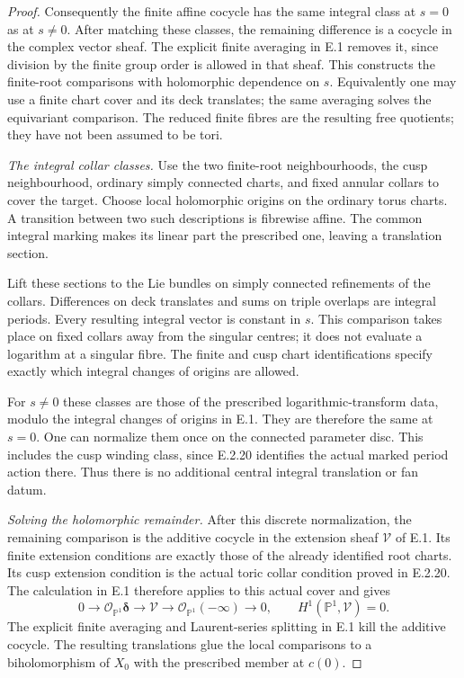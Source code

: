 \begin{proof}
Consequently the finite affine cocycle has the same
integral class at $s=0$ as at $s\ne0$.  After matching
these classes, the remaining difference is a cocycle
in the complex vector sheaf.  The explicit finite
averaging in E.1 removes it, since division by the
finite group order is allowed in that sheaf.
This constructs the finite-root comparisons with
holomorphic dependence on $s$.  Equivalently one
may use a finite chart cover and its deck translates;
the same averaging solves the equivariant comparison.
The reduced finite fibres are the resulting free
quotients; they have not been assumed to be tori.

\emph{The integral collar classes.}
Use the two finite-root neighbourhoods, the cusp
neighbourhood, ordinary simply connected charts,
and fixed annular collars to cover the target.
Choose local holomorphic origins on the ordinary
torus charts.  A transition between two such
descriptions is fibrewise affine.  The common
integral marking makes its linear part the
prescribed one, leaving a translation section.

Lift these sections to the Lie bundles on simply
connected refinements of the collars.  Differences
on deck translates and sums on triple overlaps
are integral periods.  Every resulting integral
vector is constant in $s$.  This comparison takes
place on fixed collars away from the singular
centres; it does not evaluate a logarithm at a
singular fibre.  The finite and cusp chart
identifications specify exactly which integral
changes of origins are allowed.

For $s\ne0$ these classes are those of the
prescribed logarithmic-transform data, modulo
the integral changes of origins in E.1.
They are therefore the same at $s=0$.
One can normalize them once on the connected
parameter disc.  This includes the cusp
winding class, since E.2.20 identifies the
actual marked period action there.  Thus
there is no additional central integral
translation or fan datum.

\emph{Solving the holomorphic remainder.}
After this discrete normalization, the remaining
comparison is the additive cocycle in the
extension sheaf $\mathcal V$ of E.1.  Its
finite extension conditions are exactly
those of the already identified root
charts.  Its cusp extension condition
is the actual toric collar condition
proved in E.2.20.  The calculation in
E.1 therefore applies to this actual
cover and gives
\[
 0\longrightarrow\mathcal O_{\mathbb P^1}
       \boldsymbol\delta
 \longrightarrow\mathcal V
 \longrightarrow\mathcal O_{\mathbb P^1}(-\infty)
 \longrightarrow0,
 \qquad H^1(\mathbb P^1,\mathcal V)=0.
\]
The explicit finite averaging and Laurent-series
splitting in E.1 kill the additive cocycle.
The resulting translations glue the local
comparisons to a biholomorphism of $X_0$
with the prescribed member at $c(0)$.


\end{proof}
